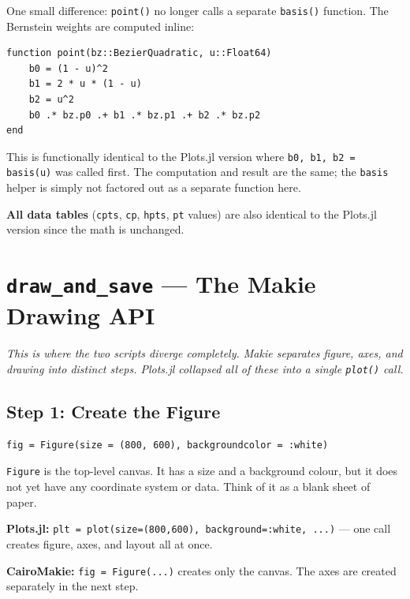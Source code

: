 \documentclass[12pt, a4paper]{article}
\newcommand{\cd}[1]{\texttt{#1}}
\begin{document}
One small difference: \cd{point()} no longer calls a
separate \cd{basis()} function.
The Bernstein weights are computed inline:

\begin{verbatim}
function point(bz::BezierQuadratic, u::Float64)
    b0 = (1 - u)^2
    b1 = 2 * u * (1 - u)
    b2 = u^2
    b0 .* bz.p0 .+ b1 .* bz.p1 .+ b2 .* bz.p2
end
\end{verbatim}

This is functionally identical to the Plots.jl version
where \cd{b0, b1, b2 = basis(u)} was called first.
The computation and result are the same; the \cd{basis}
helper is simply not factored out as a separate function here.

\textbf{All data tables} (\cd{cpts}, \cd{cp}, \cd{hpts},
\cd{pt} values) are also identical to the Plots.jl version
since the math is unchanged.


\section{\texttt{draw\_and\_save} --- The Makie Drawing API}

\textit{This is where the two scripts diverge completely.
Makie separates figure, axes, and drawing into distinct steps.
Plots.jl collapsed all of these into a single \cd{plot()} call.}

\subsection{Step 1: Create the Figure}

\begin{verbatim}
fig = Figure(size = (800, 600), backgroundcolor = :white)
\end{verbatim}

\cd{Figure} is the top-level canvas.
It has a size and a background colour, but it does not yet
have any coordinate system or data.
Think of it as a blank sheet of paper.

\begin{diffbox}
\textbf{Plots.jl:} \cd{plt = plot(size=(800,600), background=:white, ...)}
--- one call creates figure, axes, and layout all at once.

\textbf{CairoMakie:} \cd{fig = Figure(...)} creates only the canvas.
The axes are created separately in the next step.
\end{diffbox}
\end{document}

